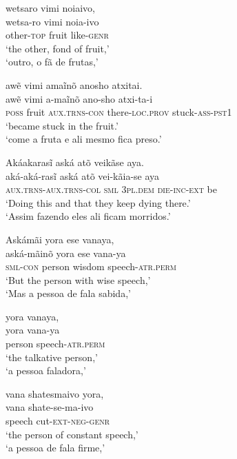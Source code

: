 \documentclass[output=paper,
modfonts,nonflat
]{langsci/langscibook}
\begin{document}
\newpage 
\ea wetsaro vimi noiaivo, \\[.3em]
\gll wetsa-ro           vimi  noia-ivo           \\
     other-\textsc{top} fruit like-\textsc{genr} \\
\glt `the other, fond of fruit,' \\
`outro, o fã de frutas,' \\
\z

\ea awẽ vimi amaĩnõ anosho atxitai. \\[.3em]
\gll awẽ           vimi  a-maĩnõ               ano-sho                 atxi-ta-i               \\
     \textsc{poss} fruit \textsc{aux.trns-con} there-\textsc{loc.prov} stuck-\textsc{ass-pst1} \\
\glt `became stuck in the fruit.' \\
`come a fruta e ali mesmo fica preso.' \\
\z

\ea Akáakarasĩ aská atõ veikãse aya. \\[.3em]
\gll aká-aká-rasĩ                   aská         atõ              vei-kãia-se          aya \\
     \textsc{aux.trns-aux.trns-col} \textsc{sml} 3\textsc{pl.dem} \textsc{die-inc-ext} be  \\
\glt `Doing this and that they keep dying there.' \\
`Assim fazendo eles ali ficam morridos.' \\
\z

\ea Askámãi yora ese vanaya, \\[.3em]
\gll aská-mãinõ       yora   ese    vana-ya                  \\
     \textsc{sml-con} person wisdom speech-\textsc{atr.perm} \\
\glt `But the person with wise speech,' \\
`Mas a pessoa de fala sabida,' \\
\z

\ea yora vanaya, \\[.3em]
\gll yora   vana-ya                  \\
     person speech-\textsc{atr.perm} \\
\glt `the talkative person,' \\
`a pessoa faladora,' \\
\z

\ea vana shatesmaivo yora, \\[.3em]
\gll vana   shate-se-ma-ivo           \\
     speech cut-\textsc{ext-neg-genr} \\
\glt `the person of constant speech,' \\
`a pessoa de fala firme,' \\
\z
\end{document}
